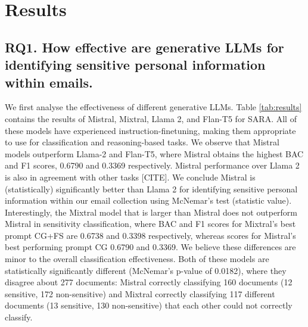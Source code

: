 \section{Results}

\subsection{RQ1. How effective are generative LLMs for identifying sensitive personal information within emails.}

We first analyse the effectiveness of different generative LLMs. Table \ref{tab:results} contains the results of Mistral, Mixtral, Llama 2, and Flan-T5 for SARA. All of these models have experienced instruction-finetuning, making them appropriate to use for classification and reasoning-based tasks. We observe that Mistral models outperform Llama-2 and Flan-T5, where Mistral obtains the highest BAC and F1 scores, 0.6790 and 0.3369 respectively. Mistral performance over Llama 2 is also in agreement with other tasks [CITE]. We conclude Mistral is (statistically) significantly better than Llama 2 for identifying sensitive personal information within our email collection using McNemar’s test (statistic value). Interestingly, the Mixtral model that is larger than Mistral does not outperform Mistral in sensitivity classification, where BAC and F1 scores for Mixtral’s best prompt CG+FS are 0.6738 and 0.3398 respectively, whereas scores for Mistral’s best performing prompt CG 0.6790 and 0.3369. We believe these differences are minor to the overall classification effectiveness. Both of these models are statistically significantly different (McNemar’s p-value of 0.0182), where they disagree about 277 documents: Mistral correctly classifying 160 documents (12 sensitive, 172 non-sensitive) and Mixtral correctly classifying 117 different documents (13 sensitive, 130 non-sensitive) that each other could not correctly classify.

